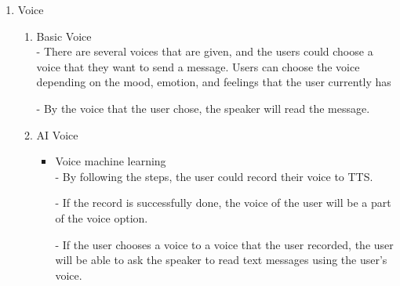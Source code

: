 \documentclass[conference]{IEEEtran}
\begin{document}
\begin{enumerate}
    \item Voice
    \begin{enumerate}
        \item Basic Voice\\
        - There are several voices that are given, and the users could choose a voice that they want to send a message. Users can choose the voice depending on the mood, emotion, and feelings that the user currently has
        
        - By the voice that the user chose, the speaker will read the message.
        \item AI Voice
        \begin{itemize}
        \item Voice machine learning\\
        - By following the steps, the user could record their voice to TTS.
        
        - If the record is successfully done, the voice of the user will be a part of the voice option. 
        
        - If the user chooses a voice to a voice that the user recorded, the user will be able to ask the speaker to read text messages using the user's voice.
        \end{itemize}
    \end{enumerate}
\end{enumerate}
\end{document}
